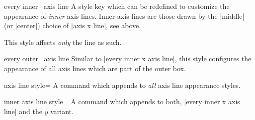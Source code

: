 \begin{pgfplotsxykey}{every inner \x\ axis line}
    A style key which can be redefined to customize the appearance of
    \emph{inner} axis lines. Inner axis lines are those drawn by the |middle|
    (or |center|) choice of |axis x line|, see above.

    This style affects \emph{only} the line as such.
\begin{codeexample}[]
\end{codeexample}
\end{pgfplotsxykey}

\begin{pgfplotsxykey}{every outer \x\ axis line}
    Similar to |every inner x axis line|, this style configures the appearance
    of all axis lines which are part of the outer box.
\begin{codeexample}[]
\end{codeexample}
\end{pgfplotsxykey}

\label{pgfplots:page:axislines}
\begin{pgfplotskey}{axis line style=}
    A command which appends  to \emph{all} axis line
    appearance styles.
\end{pgfplotskey}

\begin{pgfplotskey}{inner axis line style=}
    A command which appends  to both,
    |every inner x axis line| and the $y$ variant.
\end{pgfplotskey}

